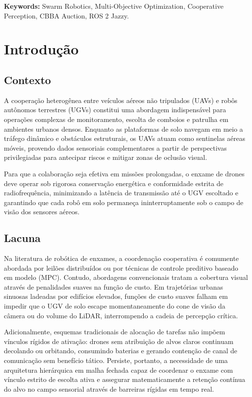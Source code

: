 \documentclass[
  brazilian,
  a4paper]{article}
\begin{document}
\textbf{Keywords:} Swarm Robotics, Multi-Objective Optimization,
Cooperative Perception, CBBA Auction, ROS 2 Jazzy.

\section{Introdução}\label{introduuxe7uxe3o}

\subsection{Contexto}\label{contexto}

A cooperação heterogênea entre veículos aéreos não tripulados (UAVs) e
robôs autônomos terrestres (UGVs) constitui uma abordagem indispensável
para operações complexas de monitoramento, escolta de comboios e
patrulha em ambientes urbanos densos. Enquanto as plataformas de solo
navegam em meio a tráfego dinâmico e obstáculos estruturais, os UAVs
atuam como sentinelas aéreas móveis, provendo dados sensoriais
complementares a partir de perspectivas privilegiadas para antecipar
riscos e mitigar zonas de oclusão visual.

Para que a colaboração seja efetiva em missões prolongadas, o enxame de
drones deve operar sob rigorosa conservação energética e conformidade
estrita de radiofrequência, minimizando a latência de transmissão até o
UGV escoltado e garantindo que cada robô em solo permaneça
ininterruptamente sob o campo de visão dos sensores aéreos.

\subsection{Lacuna}\label{lacuna}

Na literatura de robótica de enxames, a coordenação cooperativa é
comumente abordada por leilões distribuídos ou por técnicas de controle
preditivo baseado em modelo (MPC). Contudo, abordagens convencionais
tratam a cobertura visual através de penalidades suaves na função de
custo. Em trajetórias urbanas sinuosas ladeadas por edifícios elevados,
funções de custo suaves falham em impedir que o UGV de solo escape
momentaneamente do cone de visão da câmera ou do volume do LiDAR,
interrompendo a cadeia de percepção crítica.

Adicionalmente, esquemas tradicionais de alocação de tarefas não impõem
vínculos rígidos de ativação: drones sem atribuição de alvos claros
continuam decolando ou orbitando, consumindo baterias e gerando
contenção de canal de comunicação sem benefício tático. Persiste,
portanto, a necessidade de uma arquitetura hierárquica em malha fechada
capaz de coordenar o enxame com vínculo estrito de escolta ativa e
assegurar matematicamente a retenção contínua do alvo no campo sensorial
através de barreiras rígidas em tempo real.
\end{document}
